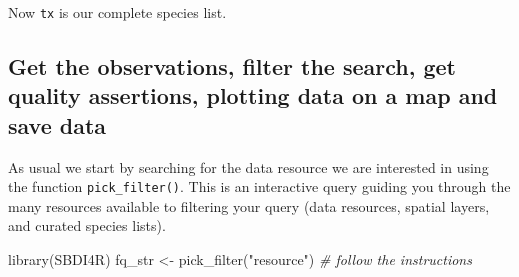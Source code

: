\documentclass[
  10pt,
]{article}
\newenvironment{Shaded}{\begin{snugshade}}{\end{snugshade}}
\newcommand{\AttributeTok}[1]{\textcolor[rgb]{0.77,0.63,0.00}{#1}}
\newcommand{\CommentTok}[1]{\textcolor[rgb]{0.56,0.35,0.01}{\textit{#1}}}
\newcommand{\ConstantTok}[1]{\textcolor[rgb]{0.00,0.00,0.00}{#1}}
\newcommand{\DocumentationTok}[1]{\textcolor[rgb]{0.56,0.35,0.01}{\textbf{\textit{#1}}}}
\newcommand{\FunctionTok}[1]{\textcolor[rgb]{0.00,0.00,0.00}{#1}}
\newcommand{\NormalTok}[1]{#1}
\newcommand{\OtherTok}[1]{\textcolor[rgb]{0.56,0.35,0.01}{#1}}
\newcommand{\SpecialCharTok}[1]{\textcolor[rgb]{0.00,0.00,0.00}{#1}}
\newcommand{\StringTok}[1]{\textcolor[rgb]{0.31,0.60,0.02}{#1}}
\begin{document}
\begin{Shaded}
\end{Shaded}

Now \texttt{tx} is our complete species list.

\hypertarget{get-the-observations-filter-the-search-get-quality-assertions-plotting-data-on-a-map-and-save-data}{%
\subsection{Get the observations, filter the search, get quality assertions, plotting data on a map and save data}\label{get-the-observations-filter-the-search-get-quality-assertions-plotting-data-on-a-map-and-save-data}}

As usual we start by searching for the data resource we are interested in using
the function \texttt{pick\_filter()}. This is an interactive query guiding you through
the many resources available to filtering your query (data resources, spatial
layers, and curated species lists).

\begin{Shaded}
\begin{Highlighting}[]
\FunctionTok{library}\NormalTok{(SBDI4R)}
\NormalTok{fq\_str }\OtherTok{\textless{}{-}} \FunctionTok{pick\_filter}\NormalTok{(}\StringTok{"resource"}\NormalTok{) }
\CommentTok{\# follow the instructions }
\end{Highlighting}
\end{Shaded}
\end{document}
